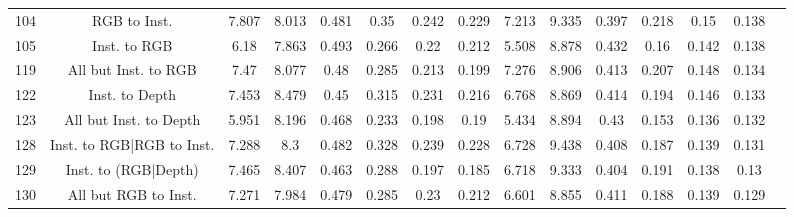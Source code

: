 \begin{table}
\begin{tabular}{@{\hskip3pt}c@{\hskip3pt}c@{\hskip3pt}c@{\hskip3pt}c@{\hskip3pt}c@{\hskip3pt}c@{\hskip3pt}c@{\hskip3pt}c@{\hskip3pt}c@{\hskip3pt}c@{\hskip3pt}c@{\hskip3pt}c@{\hskip3pt}c@{\hskip3pt}c@{\hskip3pt}c}
                                          104 &                   RGB to Inst. &             7.807 &          8.013 &           0.481 &            0.35 &           0.242 &           0.229 &               7.213 &         9.335 &           0.397 &           0.218 &            0.15 &           0.138 \\
                                          105 &                   Inst. to RGB &              6.18 &          7.863 &           0.493 &           0.266 &            0.22 &           0.212 &               5.508 &         8.878 &           0.432 &            0.16 &           0.142 &           0.138 \\
                                          119 &           All but Inst. to RGB &              7.47 &          8.077 &            0.48 &           0.285 &           0.213 &           0.199 &               7.276 &         8.906 &           0.413 &           0.207 &           0.148 &           0.134 \\
                                          122 &                 Inst. to Depth &             7.453 &          8.479 &            0.45 &           0.315 &           0.231 &           0.216 &               6.768 &         8.869 &           0.414 &           0.194 &           0.146 &           0.133 \\
                                          123 &         All but Inst. to Depth &             5.951 &          8.196 &           0.468 &           0.233 &           0.198 &            0.19 &               5.434 &         8.894 &            0.43 &           0.153 &           0.136 &           0.132 \\
                                          128 &      Inst. to RGB|RGB to Inst. &             7.288 &            8.3 &           0.482 &           0.328 &           0.239 &           0.228 &               6.728 &         9.438 &           0.408 &           0.187 &           0.139 &           0.131 \\
                                          129 &           Inst. to (RGB|Depth) &             7.465 &          8.407 &           0.463 &           0.288 &           0.197 &           0.185 &               6.718 &         9.333 &           0.404 &           0.191 &           0.138 &            0.13 \\
                                          130 &           All but RGB to Inst. &             7.271 &          7.984 &           0.479 &           0.285 &            0.23 &           0.212 &               6.601 &         8.855 &           0.411 &           0.188 &           0.139 &           0.129 \\

\end{tabular}
\end{table}
